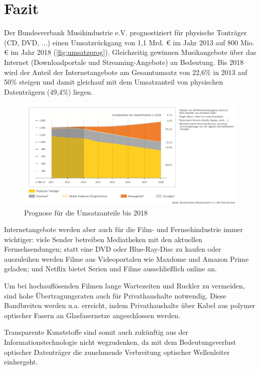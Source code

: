 \section{Fazit}
\label{sec:schluss}

Der Bundesverbank Musikindustrie e.V. prognostiziert für physische Tonträger
(CD, DVD, ...) einen Umsatzrückgang von 1,1 Mrd. \euro{} im Jahr 2013 auf 800
Mio. \euro{} im Jahr 2018 (\autoref{fig:umsatzprog}). Gleichzeitig gewinnen
Musikangebote über das Internet (Downloadportale und Streaming-Angebote) an
Bedeutung. Bis 2018 wird der Anteil der Internetangebote am Gesamtumsatz von
22,6\% in 2013 auf 50\% steigen und damit gleichauf mit dem Umsatzanteil von
physischen Datenträgern (49,4\%) liegen.

\begin{figure}[h]
    \begin{center}
        \begin{minipage}[t]{\textwidth}
            \begin{center}
                \includegraphics[width=\textwidth]{Bilder/Schluss/prognose.png}
                \caption[Prognose für die Umsatzanteile bis 2018 \newline \url{http://www.musikindustrie.de/uploads/media/140325\_BVMI\_2013\_Jahrbuch\_ePaper\_V02.pdf} S.15 (zuletzt aufgerufen am 03.08.2015)]{Prognose für die Umsatzanteile bis 2018}
                \label{fig:umsatzprog}
            \end{center}
        \end{minipage}
    \end{center}
\end{figure}

Internetangebote werden aber auch für die Film- und Fernsehindustrie immer
wichtiger: viele Sender betreiben Mediatheken mit den aktuellen
Fernsehsendungen; statt eine DVD oder Blue-Ray-Disc zu kaufen oder auszuleihen
werden Filme aus Videoportalen wie Maxdome und Amazon Prime geladen; und Netflix
bietet Serien und Filme ausschließlich online an.

Um bei hochauflösenden Filmen lange Wartezeiten und \glqq Ruckler\grqq{} zu
vermeiden, sind hohe Übertragungsraten auch für Privathaushalte notwendig. Diese
Bandbreiten werden u.a. erreicht, indem Privathaushalte über Kabel aus polymer
optischer Fasern an Glasfasernetze angeschlossen werden.

Transparente Kunststoffe sind somit auch zukünftig aus der
Informationstechnologie nicht wegzudenken, da mit dem Bedeutungsverlust
optischer Datenträger die zunehmende Verbreitung optischer Wellenleiter
einhergeht.
